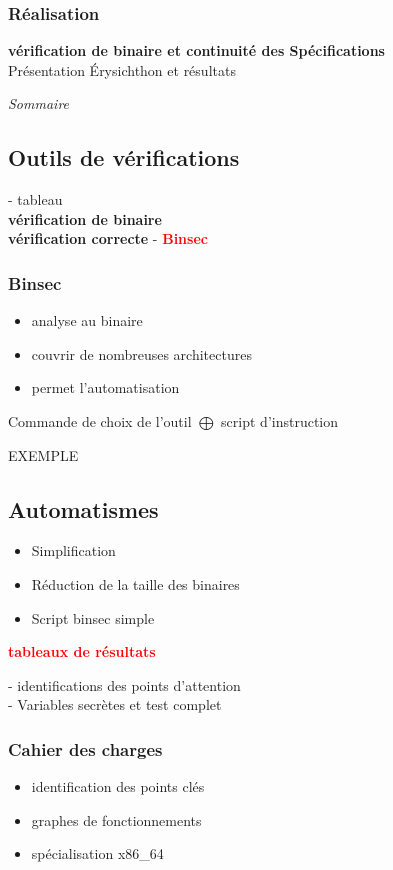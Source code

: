 \documentclass[10pt,a5paper]{article}
\newcommand{\important}[1]{\textbf{\textcolor{red}{#1}}}
\begin{document}
\subsubsection*{Réalisation}
\textbf{vérification de binaire et continuité des Spécifications}\\
Présentation Érysichthon et résultats

\medbreak
\textit{Sommaire}
\newpage

\subsection*{Outils de vérifications}
- tableau \\
\textbf{vérification de binaire}\\
\textbf{vérification correcte}
\smallbreak
- \important{Binsec}
\subsubsection*{Binsec}
\begin{itemize}
  \item analyse au binaire
  \item couvrir de nombreuses architectures
  \item permet l'automatisation
\end{itemize}

Commande de choix de l'outil $\bigoplus$ script d'instruction\smallbreak

EXEMPLE

\subsection*{Automatismes}
\begin{itemize}
  \item Simplification
  \item Réduction de la taille des binaires
  \item Script binsec simple
\end{itemize}
\important{tableaux de résultats}\smallbreak

- identifications des points d'attention\\
- Variables secrètes et test complet

\subsubsection*{Cahier des charges}
\begin{itemize}
  \item identification des points clés
  \item graphes de fonctionnements
  \item spécialisation x86\_64
\end{itemize}
\end{document}
